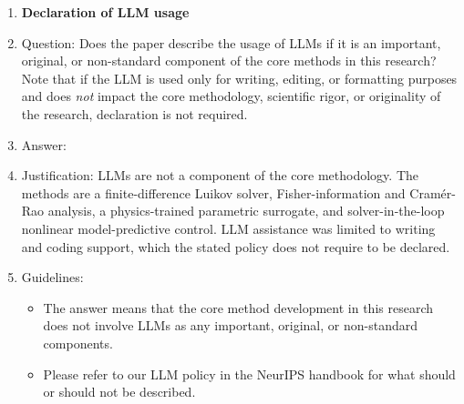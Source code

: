 \begin{enumerate}
\item {\bf Declaration of LLM usage}
    \item[] Question: Does the paper describe the usage of LLMs if it is an important, original, or non-standard component of the core methods in this research? Note that if the LLM is used only for writing, editing, or formatting purposes and does \emph{not} impact the core methodology, scientific rigor, or originality of the research, declaration is not required.
    \item[] Answer: \answerNA{} %
    \item[] Justification: LLMs are not a component of the core methodology. The methods are a finite-difference Luikov solver, Fisher-information and Cram\'er-Rao analysis, a physics-trained parametric surrogate, and solver-in-the-loop nonlinear model-predictive control. LLM assistance was limited to writing and coding support, which the stated policy does not require to be declared.
    \item[] Guidelines:
    \begin{itemize}
        \item The answer \answerNA{} means that the core method development in this research does not involve LLMs as any important, original, or non-standard components.
        \item Please refer to our LLM policy in the NeurIPS handbook for what should or should not be described.
    \end{itemize}

\end{enumerate}